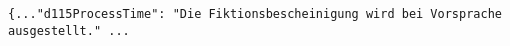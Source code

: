 \begin{verbatim}
{..."d115ProcessTime": "Die Fiktionsbescheinigung wird bei Vorsprache ausgestellt." ...
\end{verbatim}

%
%












\clearpage





